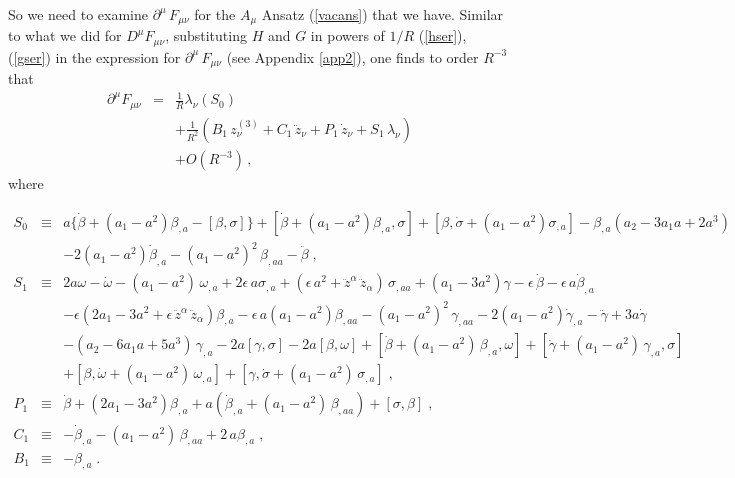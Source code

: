 \documentclass[a4paper,twocolumn,prd,showpacs,amsmath,amssymb]{revtex4}
\begin{document}
So we need to examine $\partial^{\mu} \, F_{\mu\nu}$ for the $A_{\mu}$ Ansatz
(\ref{vacans}) that we have. Similar to what we did for $D^{\mu} F_{\mu\nu}$,
substituting $H$ and $G$ in powers of $1/R$ (\ref{hser}), (\ref{gser}) in the
expression for $\partial^{\mu} \, F_{\mu\nu}$ (see Appendix \ref{app2}), one
finds to order $R^{-3}$ that
\begin{eqnarray*}
\partial^{\mu} F_{\mu\nu} & = & \frac{1}{R} \lambda_{\nu} (S_{0}) \\
& & + \frac{1}{R^2} (B_{1} \, z^{(3)}_{\nu} + C_{1} \, \ddot{z}_{\nu}
+ P_{1} \, \dot{z}_{\nu} + S_{1} \, \lambda_{\nu}) \\
& & + O(R^{-3}) \, ,
\end{eqnarray*}
where
\begin{widetext}
\begin{eqnarray}
S_{0} & \equiv & a \{ \dot{\beta} +  (a_{1} - a^2) \beta_{,a} - [\beta,\sigma] \}
+ [\dot{\beta} +  (a_{1} - a^2) \beta_{,a}, \sigma]
+ [\beta, \dot{\sigma} +  (a_{1} - a^2) \sigma_{,a}]
- \beta_{,a} (a_{2} - 3 a_{1} a + 2 a^{3})
 \nonumber \\
& &  - 2 (a_{1} - a^2) \dot{\beta}_{,a} - (a_{1} - a^2)^2 \, \beta_{,aa}
- \ddot{\beta} \; , \label{s0eq} \\
S_{1} & \equiv & 2 a \omega - \dot{\omega} - (a_{1} - a^2) \, \omega_{,a}
+ 2 \epsilon \, a \sigma_{,a} + (\epsilon \, a^2 + \ddot{z}^{\alpha} \, \ddot{z}_{\alpha}) \,
\sigma_{,aa} + (a_{1} - 3 a^2) \gamma - \epsilon \, \dot{\beta}
- \epsilon \, a \dot{\beta}_{,a} \nonumber \\
& & - \epsilon (2 a_{1} - 3 a^2 + \epsilon \, \ddot{z}^{\alpha} \, \ddot{z}_{\alpha}) \beta_{,a}
- \epsilon \, a (a_{1} - a^2) \beta_{,aa} - (a_{1} - a^2)^{2} \, \gamma_{,aa}
- 2 (a_{1} - a^2) \dot{\gamma}_{,a} - \ddot{\gamma} + 3 a \dot{\gamma}
\nonumber \\
& & - (a_{2} - 6 a_{1} a + 5 a^3) \, \gamma_{,a} - 2 a [\gamma,\sigma]
- 2 a [\beta,\omega] + [\dot{\beta} +  (a_{1} - a^2) \, \beta_{,a},\omega]
+ [\dot{\gamma} +  (a_{1} - a^2) \, \gamma_{,a},\sigma] \nonumber \\
& & + [\beta,\dot{\omega} +  (a_{1} - a^2) \, \omega_{,a}]
+ [\gamma, \dot{\sigma} +  (a_{1} - a^2) \, \sigma_{,a}] \; , \label{s1eq} \\
P_{1} & \equiv & \dot{\beta} + (2 a_{1} - 3 a^2) \beta_{,a}
+ a (\dot{\beta}_{,a} + (a_{1} - a^2) \, \beta_{,aa}) + [\sigma,\beta] \; , \label{p1eq} \\
C_{1} & \equiv &  - \dot{\beta}_{,a} - (a_{1} - a^2) \, \beta_{,aa}
+ 2 \, a \beta_{,a} \; , \label{c1eq} \\
B_{1} & \equiv & - \beta_{,a} \; . \label{b1eq}
\end{eqnarray}
\end{widetext}
\end{document}
